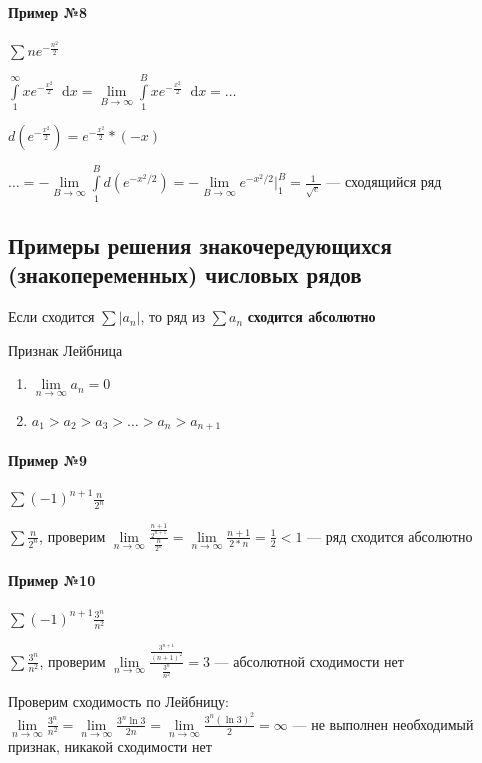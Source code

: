 \documentclass{article}
\newcommand*\diff{\mathop{}\!\mathrm{d}}
\begin{document}
\paragraph{Пример №8}

$\sum n e^{-\frac{n^2}{2}}$

$\int\limits_{1}^{\infty} x e^{-\frac{x^2}{2}} \diff x = \lim\limits_{B \to \infty} \int\limits_{1}^{B} x e^{-\frac{x^2}{2}} \diff x = \dots$

$d (e^{-\frac{x^2}{2}}) = e^{-\frac{x^2}{2}} * (-x)$

$\dots = - \lim\limits_{B \to \infty} \int\limits_{1}^{B} d(e^{-x^2/2}) = - \lim\limits_{B \to \infty} e^{-x^2/2} \bigg|_{1}^{B} = \frac{1}{\sqrt{e}}$ — сходящийся ряд

\pagebreak
\subsection{Примеры решения знакочередующихся (знакопеременных) числовых рядов}

Если сходится $\sum |a_{n}|$, то ряд из $\sum a_{n}$ \textbf{сходится абсолютно}

Признак Лейбница
\begin{enumerate}
    \item $\lim\limits_{n \to \infty} a_{n} = 0$
    \item $a_1 > a_2 > a_3 > \dots > a_{n} > a_{n + 1}$
\end{enumerate}

\paragraph{Пример №9}

$\sum (-1)^{n + 1} \frac{n}{2^{n}}$

$\sum \frac{n}{2^{n}}$, проверим $\lim\limits_{n \to \infty} \frac{\frac{n + 1}{2^{n + 1}}}{\frac{n}{2^{n}}} = \lim\limits_{n \to \infty} \frac{n + 1}{2 * n} = \frac{1}{2} < 1$ — ряд сходится абсолютно

\paragraph{Пример №10}

$\sum (-1)^{n + 1} \frac{3^{n}}{n^2}$

$\sum \frac{3^{n}}{n^2}$, проверим $\lim\limits_{n \to \infty} \frac{\frac{3^{n + 1}}{(n + 1)^2}}{\frac{3^{n}}{n^2}} = 3$ — абсолютной сходимости нет

Проверим сходимость по Лейбницу: $\lim\limits_{n \to \infty} \frac{3^{n}}{n^2} = \lim\limits_{n \to \infty} \frac{3^{n} \ln 3}{2 n} = \lim\limits_{n \to \infty} \frac{3^{n} (\ln 3)^2}{2} = \infty$ — не выполнен необходимый признак, никакой сходимости нет
\end{document}
